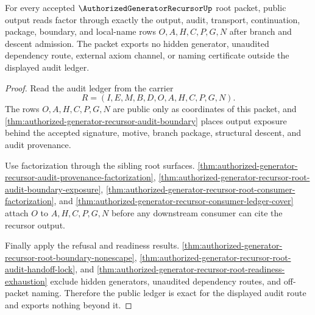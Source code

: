 \begin{theorem}
\label{thm:authorized-generator-recursor-root-audit-ledger-exactness}
For every accepted $\AuthorizedGeneratorRecursorUp$ root packet, public output reads factor through exactly the output, audit, transport, continuation, package, boundary, and local-name rows $O,A,H,C,P,G,N$ after branch and descent admission. The packet exports no hidden generator, unaudited dependency route, external axiom channel, or naming certificate outside the displayed audit ledger.
\end{theorem}
\begin{proof}
Read the audit ledger from the carrier
$$
R=(I,E,M,B,D,O,A,H,C,P,G,N).
$$
The rows $O,A,H,C,P,G,N$ are public only as coordinates of this packet, and \autoref{thm:authorized-generator-recursor-audit-boundary} places output exposure behind the accepted signature, motive, branch package, structural descent, and audit provenance.

Use factorization through the sibling root surfaces. \autoref{thm:authorized-generator-recursor-audit-provenance-factorization}, \autoref{thm:authorized-generator-recursor-root-audit-boundary-exposure}, \autoref{thm:authorized-generator-recursor-root-consumer-factorization}, and \autoref{thm:authorized-generator-recursor-consumer-ledger-cover} attach $O$ to $A,H,C,P,G,N$ before any downstream consumer can cite the recursor output.

Finally apply the refusal and readiness results. \autoref{thm:authorized-generator-recursor-root-boundary-nonescape}, \autoref{thm:authorized-generator-recursor-root-audit-handoff-lock}, and \autoref{thm:authorized-generator-recursor-root-readiness-exhaustion} exclude hidden generators, unaudited dependency routes, and off-packet naming. Therefore the public ledger is exact for the displayed audit route and exports nothing beyond it.
\end{proof}

